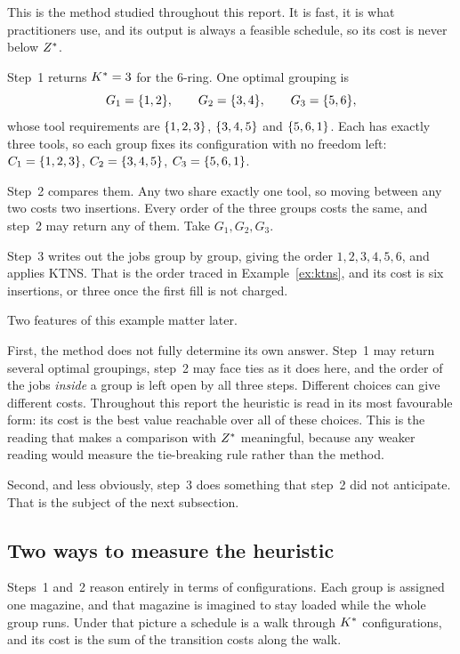 This is the method studied throughout this report. It is fast, it is what
practitioners use, and its output is always a feasible schedule, so its cost is never
below $Z^{\ast}$.

\begin{example}\label{ex:jgp-ring}
Step~1 returns $K^{\ast}=3$ for the $6$-ring. One optimal grouping is
\[
  G_1=\{1,2\},\qquad G_2=\{3,4\},\qquad G_3=\{5,6\},
\]
whose tool requirements are $\{1,2,3\}$, $\{3,4,5\}$ and $\{5,6,1\}$. Each
has exactly three tools, so each group fixes its configuration with no freedom left:
$C_1=\{1,2,3\}$, $C_2=\{3,4,5\}$, $C_3=\{5,6,1\}$.

Step~2 compares them. Any two share exactly one tool, so moving between any two
costs two insertions. Every order of the three groups costs the same, and step~2 may
return any of them. Take $G_1,G_2,G_3$.

Step~3 writes out the jobs group by group, giving the order $1,2,3,4,5,6$, and
applies KTNS. That is the order traced in Example~\ref{ex:ktns}, and its cost is six
insertions, or three once the first fill is not charged.
\end{example}

Two features of this example matter later.

First, the method does not fully determine its own answer. Step~1 may return several
optimal groupings, step~2 may face ties as it does here, and the order of the jobs
\emph{inside} a group is left open by all three steps. Different choices can give
different costs. Throughout this report the heuristic is read in its most favourable
form: its cost is the best value reachable over all of these choices. This is the
reading that makes a comparison with $Z^{\ast}$ meaningful, because any weaker reading
would measure the tie-breaking rule rather than the method.

Second, and less obviously, step~3 does something that step~2 did not anticipate.
That is the subject of the next subsection.

\subsection{Two ways to measure the heuristic}\label{ssec:frames}

Steps~1 and~2 reason entirely in terms of configurations. Each group is assigned one
magazine, and that magazine is imagined to stay loaded while the whole group runs.
Under that picture a schedule is a walk through $K^{\ast}$ configurations, and its cost
is the sum of the transition costs along the walk.

